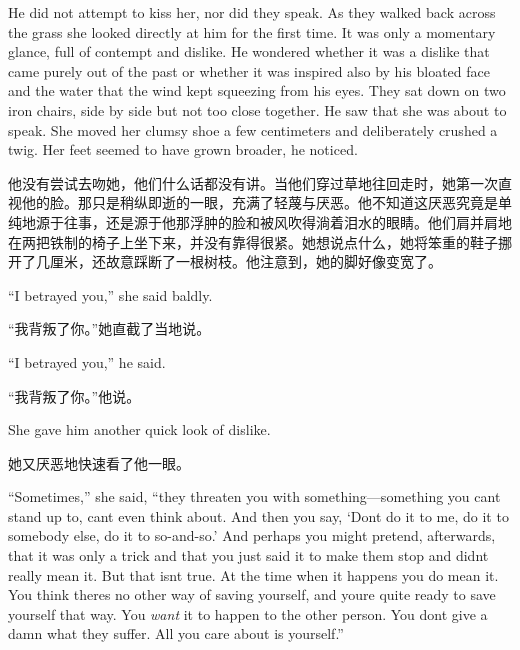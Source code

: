 \begin{paracol}{2}
\switchcolumn*

He did not attempt to kiss her, nor did they speak. As they walked back
across the grass she looked directly at him for the first time. It was
only a momentary glance, full of contempt and dislike. He wondered
whether it was a dislike that came purely out of the past or whether it
was inspired also by his bloated face and the water that the wind kept
squeezing from his eyes. They sat down on two iron chairs, side by side
but not too close together. He saw that she was about to speak. She
moved her clumsy shoe a few centimeters and deliberately crushed a twig.
Her feet seemed to have grown broader, he noticed.

\switchcolumn

他没有尝试去吻她，他们什么话都没有讲。当他们穿过草地往回走时，她第一次直视他的脸。那只是稍纵即逝的一眼，充满了轻蔑与厌恶。他不知道这厌恶究竟是单纯地源于往事，还是源于他那浮肿的脸和被风吹得淌着泪水的眼睛。他们肩并肩地在两把铁制的椅子上坐下来，并没有靠得很紧。她想说点什么，她将笨重的鞋子挪开了几厘米，还故意踩断了一根树枝。他注意到，她的脚好像变宽了。

\switchcolumn*

``I betrayed you,'' she said baldly.

\switchcolumn

``我背叛了你。''她直截了当地说。

\switchcolumn*

``I betrayed you,'' he said.

\switchcolumn

``我背叛了你。''他说。

\switchcolumn*

She gave him another quick look of dislike.

\switchcolumn

她又厌恶地快速看了他一眼。

\switchcolumn*

``Sometimes,'' she said, ``they threaten you with something---something you
can\textquotesingle t stand up to, can\textquotesingle t even think
about. And then you say, `Don\textquotesingle t do it to
me, do it to somebody else, do it to so-and-so.' And
perhaps you might pretend, afterwards, that it was only a trick and that
you just said it to make them stop and didn\textquotesingle t really
mean it. But that isn\textquotesingle t true. At the time when it
happens you do mean it. You think there\textquotesingle s no other way
of saving yourself, and you\textquotesingle re quite ready to save
yourself that way. You \emph{want} it to happen to the other person. You
don\textquotesingle t give a damn what they suffer. All you care about
is yourself.''


\end{paracol}
